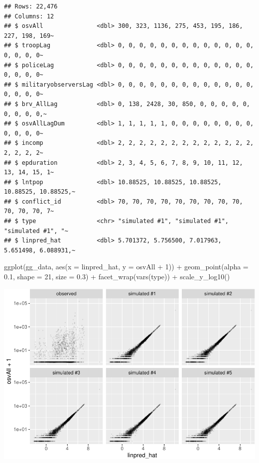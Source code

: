 \documentclass[
]{book}
\newenvironment{Shaded}{\begin{snugshade}}{\end{snugshade}}
\newcommand{\AttributeTok}[1]{\textcolor[rgb]{0.77,0.63,0.00}{#1}}
\newcommand{\DecValTok}[1]{\textcolor[rgb]{0.00,0.00,0.81}{#1}}
\newcommand{\FloatTok}[1]{\textcolor[rgb]{0.00,0.00,0.81}{#1}}
\newcommand{\FunctionTok}[1]{\textcolor[rgb]{0.00,0.00,0.00}{#1}}
\newcommand{\NormalTok}[1]{#1}
\newcommand{\SpecialCharTok}[1]{\textcolor[rgb]{0.00,0.00,0.00}{#1}}
\begin{document}
\begin{verbatim}
## Rows: 22,476
## Columns: 12
## $ osvAll               <dbl> 300, 323, 1136, 275, 453, 195, 186, 227, 198, 169~
## $ troopLag             <dbl> 0, 0, 0, 0, 0, 0, 0, 0, 0, 0, 0, 0, 0, 0, 0, 0, 0~
## $ policeLag            <dbl> 0, 0, 0, 0, 0, 0, 0, 0, 0, 0, 0, 0, 0, 0, 0, 0, 0~
## $ militaryobserversLag <dbl> 0, 0, 0, 0, 0, 0, 0, 0, 0, 0, 0, 0, 0, 0, 0, 0, 0~
## $ brv_AllLag           <dbl> 0, 138, 2428, 30, 850, 0, 0, 0, 0, 0, 0, 0, 0, 0,~
## $ osvAllLagDum         <dbl> 1, 1, 1, 1, 1, 0, 0, 0, 0, 0, 0, 0, 0, 0, 0, 0, 0~
## $ incomp               <dbl> 2, 2, 2, 2, 2, 2, 2, 2, 2, 2, 2, 2, 2, 2, 2, 2, 2~
## $ epduration           <dbl> 2, 3, 4, 5, 6, 7, 8, 9, 10, 11, 12, 13, 14, 15, 1~
## $ lntpop               <dbl> 10.88525, 10.88525, 10.88525, 10.88525, 10.88525,~
## $ conflict_id          <dbl> 70, 70, 70, 70, 70, 70, 70, 70, 70, 70, 70, 70, 7~
## $ type                 <chr> "simulated #1", "simulated #1", "simulated #1", "~
## $ linpred_hat          <dbl> 5.701372, 5.756500, 7.017963, 5.651498, 6.088931,~
\end{verbatim}

\begin{Shaded}
\begin{Highlighting}[]
\FunctionTok{ggplot}\NormalTok{(gg\_data, }\FunctionTok{aes}\NormalTok{(}\AttributeTok{x =}\NormalTok{ linpred\_hat, }\AttributeTok{y =}\NormalTok{ osvAll }\SpecialCharTok{+} \DecValTok{1}\NormalTok{)) }\SpecialCharTok{+} 
  \FunctionTok{geom\_point}\NormalTok{(}\AttributeTok{alpha =} \FloatTok{0.1}\NormalTok{, }\AttributeTok{shape =} \DecValTok{21}\NormalTok{, }\AttributeTok{size =} \FloatTok{0.3}\NormalTok{) }\SpecialCharTok{+} 
  \FunctionTok{facet\_wrap}\NormalTok{(}\FunctionTok{vars}\NormalTok{(type)) }\SpecialCharTok{+} 
  \FunctionTok{scale\_y\_log10}\NormalTok{()}
\end{Highlighting}
\end{Shaded}

\includegraphics{03-03-poisson-model_files/figure-latex/unnamed-chunk-4-1.pdf}
\end{document}

